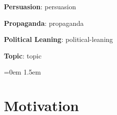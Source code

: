 \textbf{Persuasion}: \glsdesc*{persuasion}

\textbf{Propaganda}: \glsdesc{propaganda}

\textbf{Political Leaning}: \glsdesc{political-leaning}

\textbf{Topic}: \glsdesc{topic}


\leftskip=0em
\parindent 1.5em


\section{Motivation}
\label{sec:intro_motivation}







